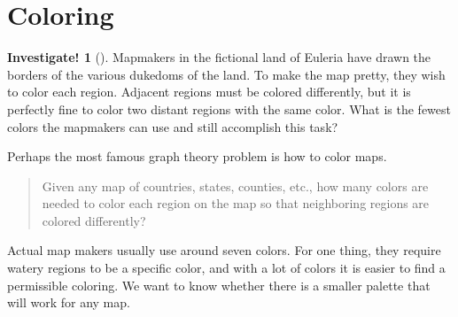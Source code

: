 \documentclass[10pt,]{book}
\theoremstyle{plain}
\theoremstyle{definition}
\theoremstyle{definition}
\theoremstyle{definition}
\newtheorem{investigation}[project]{Investigate!}
\theoremstyle{definition}
\numberwithin{equation}{chapter}
\begin{document}
\section[{Coloring}]{Coloring}\label{sec_coloring}
\begin{investigation}[]\label{investigation-5}
\hypertarget{p-302}{}%
Mapmakers in the fictional land of Euleria have drawn the borders of the various dukedoms of the land. To make the map pretty, they wish to color each region. Adjacent regions must be colored differently, but it is perfectly fine to color two distant regions with the same color. What is the fewest colors the mapmakers can use and still accomplish this task?%
\begin{sidebyside}{1}{0.125}{0.125}{0}
\begin{sbspanel}{0.75}
\end{sbspanel}
\end{sidebyside}
\end{investigation}
\hypertarget{p-303}{}%
Perhaps the most famous graph theory problem is how to color maps.%
\begin{quote}\hypertarget{blockquote-2}{}
\hypertarget{p-304}{}%
Given any map of countries, states, counties, etc., how many colors are needed to color each region on the map so that neighboring regions are colored differently?%
\end{quote}
\hypertarget{p-305}{}%
Actual map makers usually use around seven colors. For one thing, they require watery regions to be a specific color, and with a lot of colors it is easier to find a permissible coloring. We want to know whether there is a smaller palette that will work for any map.%
\end{document}
